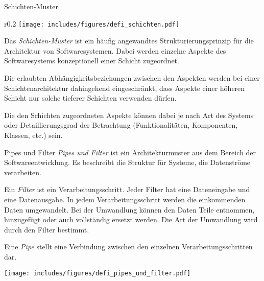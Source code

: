 \begin{defi}{Schichten-Muster}
    \begin{wrapfigure}{r}{0.2\textwidth}
        \centering
        \texttt{[image: includes/figures/defi\_schichten.pdf]}
    \end{wrapfigure}
    Das \emph{Schichten-Muster} ist ein häufig angewandtes Strukturierungsprinzip für die Architektur von Softwaresystemen.
    Dabei werden einzelne Aspekte des Softwaresystems konzeptionell einer Schicht zugeordnet.

    Die erlaubten Abhängigkeitsbeziehungen zwischen den Aspekten werden bei einer Schichtenarchitektur dahingehend eingeschränkt, dass Aspekte einer höheren Schicht nur solche tieferer Schichten verwenden dürfen.

    Die den Schichten zugeordneten Aspekte können dabei je nach Art des Systems oder Detaillierungsgrad der Betrachtung (Funktionalitäten, Komponenten, Klassen, etc.) sein.

    \vspace{5em}
\end{defi}

\begin{defi}{Pipes und Filter}
    \emph{Pipes und Filter}  ist ein Architekturmuster aus dem Bereich der Softwareentwicklung. Es beschreibt die Struktur für Systeme, die Datenströme verarbeiten.

    Ein \emph{Filter} ist ein Verarbeitungsschritt.
    Jeder Filter hat eine Dateneingabe und eine Datenausgabe.
    In jedem Verarbeitungsschritt werden die einkommenden Daten umgewandelt.
    Bei der Umwandlung können den Daten Teile entnommen, hinzugefügt oder auch vollständig ersetzt werden.
    Die Art der Umwandlung wird durch den Filter bestimmt.

    Eine \emph{Pipe} stellt eine Verbindung zwischen den einzelnen Verarbeitungsschritten dar.

    \begin{center}
        \texttt{[image: includes/figures/defi\_pipes\_und\_filter.pdf]}
    \end{center}
\end{defi}

